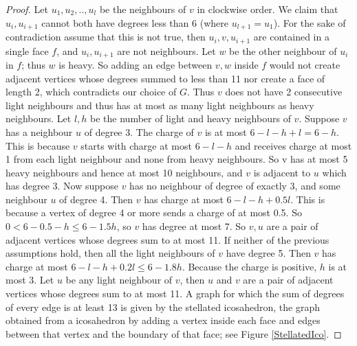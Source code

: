 \documentclass{article}
\newcommand{\0}{\mathbb{0}}
\newcommand{\1}{\mathbb{1}}
\begin{document}
\begin{proof}
 Let $u_1,u_2,..,u_l$ be the neighbours of $v$ in clockwise order. We claim that $u_i,u_{i+1}$ cannot both have degrees less than 6 (where $u_{l+1} =u_1$). For the sake of contradiction assume that this is not true, then $ u_i,v,u_{i+1} $ are contained in a single face $f$, and $u_i,u_{i+1}$ are not neighbours. Let $w$ be the other neighbour of $u_i$ in $f$; thus $w$ is heavy. So adding an edge between $v,w$ inside $f$ would not create adjacent vertices whose degrees summed to less than 11 nor create a face of length 2, which contradicts our choice of $G$.  Thus $v$ does not have 2 consecutive light neighbours and thus has at most as many light neighbours as heavy neighbours.  Let $l, h$ be the number of light and heavy neighbours of $v$. Suppose $v$ has a neighbour $u$ of degree 3. The charge of $v$ is at most  $6-l-h +l =6 -h $. This is because $v$ starts with charge at most $6-l-h$ and receives charge at most 1 from each light neighbour and none from heavy neighbours. So v has at most 5 heavy neighbours and hence at most 10 neighbours, and $v$ is adjacent to $u$ which has degree 3. 
 Now suppose $v$ has no neighbour of degree of exactly 3, and some neighbour $u$ of degree 4. Then $v$ has charge at most $ 6-l-h +0.5l $. This is because a vertex of degree 4 or more sends a charge of at most 0.5.   So $ 0 < 6-0.5-h \leq 6- 1.5h $, so $v$ has degree at most 7. So $v,u$ are a pair of adjacent vertices whose degrees sum to at most 11. If neither of the previous assumptions hold, then all the light neighbours of $v$ have degree 5. Then $v$ has charge at most $ 6-l-h +0.2l \leq 6-1.8h $. Because the charge is positive, $h$ is at most 3. Let $u$ be any light neighbour of $v$, then $u$ and $v$ are a pair of adjacent vertices whose degrees sum to at most 11. A graph for which the sum of degrees of every edge is at least 13 is given by the stellated icosahedron, the graph obtained from a icosahedron  by adding a vertex  inside each face and edges between that vertex and the boundary of that face; see Figure \ref{StellatedIco}.
 \end{proof}
 
\end{document}
